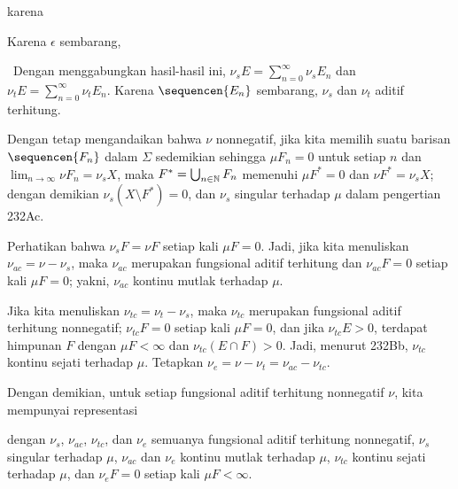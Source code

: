 {{

\noindent karena


\noindent Karena $\epsilon$ sembarang,


\noindent \grheade\ Dengan menggabungkan hasil-hasil ini,
$\nu_sE=\sum_{n=0}^{\infty}\nu_sE_n$ dan
$\nu_tE=\sum_{n=0}^{\infty}\nu_tE_n$. Karena $\sequencen{E_n}$
sembarang, $\nu_s$ dan $\nu_t$ aditif terhitung.\ \Qed}


\medskip

 Dengan tetap mengandaikan bahwa $\nu$ nonnegatif,
jika kita memilih suatu barisan $\sequencen{F_n}$ dalam $\Sigma$
sedemikian sehingga $\mu F_n=0$ untuk setiap $n$ dan
$\lim_{n\to\infty}\nu F_n=\nu_sX$, maka
$F^*=\bigcup_{n\in\Bbb N}F_n$ memenuhi $\mu F^*=0$ dan
$\nu F^*=\nu_sX$; dengan demikian $\nu_s(X\setminus F^*)=0$, dan
$\nu_s$ singular terhadap $\mu$ dalam pengertian 232Ac.

Perhatikan bahwa $\nu_sF=\nu F$ setiap kali $\mu F=0$. Jadi, jika kita
menuliskan $\nu_{ac}=\nu-\nu_s$, maka $\nu_{ac}$ merupakan fungsional
aditif terhitung dan $\nu_{ac}F=0$ setiap kali $\mu F=0$; yakni,
$\nu_{ac}$ kontinu mutlak terhadap $\mu$.

Jika kita menuliskan $\nu_{tc}=\nu_t-\nu_s$, maka $\nu_{tc}$ merupakan
fungsional aditif terhitung nonnegatif; $\nu_{tc}F=0$ setiap kali
$\mu F=0$, dan jika $\nu_{tc}E>0$, terdapat himpunan $F$ dengan
$\mu F<\infty$ dan $\nu_{tc}(E\cap F)>0$. Jadi, menurut 232Bb,
$\nu_{tc}$ kontinu sejati terhadap $\mu$. Tetapkan
$\nu_e=\nu-\nu_t=\nu_{ac}-\nu_{tc}$.

Dengan demikian, untuk setiap fungsional aditif terhitung nonnegatif
$\nu$, kita mempunyai representasi


\noindent dengan $\nu_s$, $\nu_{ac}$, $\nu_{tc}$, dan $\nu_e$ semuanya
fungsional aditif terhitung nonnegatif, $\nu_s$ singular terhadap $\mu$,
$\nu_{ac}$ dan $\nu_e$ kontinu mutlak terhadap $\mu$, $\nu_{tc}$ kontinu
sejati terhadap $\mu$, dan $\nu_eF=0$ setiap kali $\mu F<\infty$.


\medskip

}
